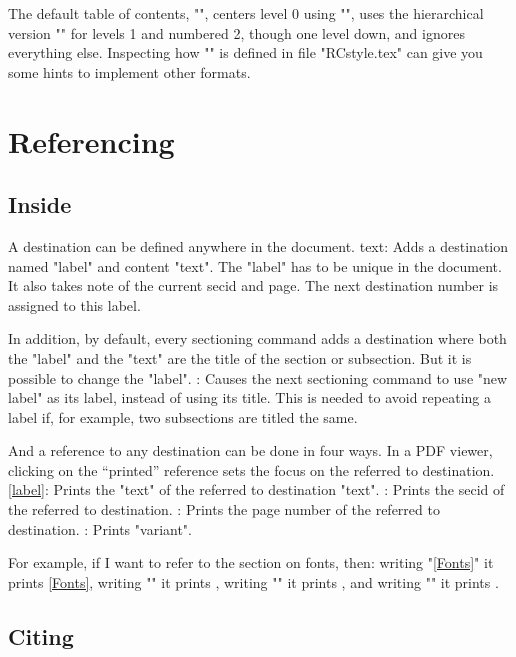 The default table of contents, "\toclineR",
centers level 0 using "\toclineC",
uses the hierarchical version "\toclineX" for levels 1 and numbered 2,
though one level down,
and ignores everything else.
Inspecting how "\toclineR" is defined in file "RCstyle.tex"
can give you some hints to implement other formats.


\section{Referencing}

\subsection{Inside}

A destination can be defined anywhere in the document.
\command\label{label}{text}:  Adds a destination
 named "label" and content "text". The "label" has to
 be unique in the document. It also takes note
 of the current {\sc secid} and page.
 The next destination number is assigned to this label.

In addition, by default, every sectioning command adds
a destination where both the "label" and the "text"
are the title of the section or subsection.
But it is possible to change the "label".
\command{}: Causes the next sectioning command
 to use "new label" as its label, instead of using its title.
 This is needed to avoid repeating a label if, for example,
 two subsections are titled the same.

And a reference to any destination can be done in four ways.
In a PDF viewer, clicking on the “printed” reference
sets the focus on the referred to destination.
\command\ref{label}: Prints the "text" of the
 referred to destination "\label{label}{text}".
\command{}: Prints the {\sc secid} of the
 referred to destination.
\command{}: Prints the page number of the
 referred to destination.
\command{}: Prints "variant".

For example, if I want to refer to the section on fonts, then:
\beginpoints
\point writing "\ref{Fonts}" it prints \ref{Fonts},
\point writing "" it prints ,
\point writing "" it prints , and
\point writing "" it prints
                .
\endpoints


\subsection{Citing}


